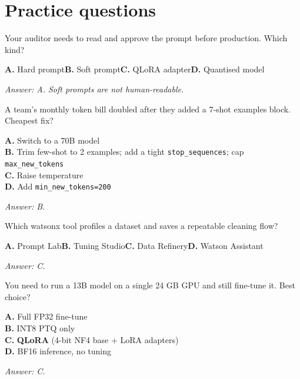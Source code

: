 \section{Practice questions}

\begin{practicebox}[title=\textbf{Q3.1 --- Hard vs Soft}]
Your auditor needs to read and approve the prompt before production. Which kind?

\textbf{A.} Hard prompt\hspace{1em}\textbf{B.} Soft prompt\hspace{1em}\textbf{C.} QLoRA adapter\hspace{1em}\textbf{D.} Quantised model

\vspace{0.2cm}\textit{Answer: A. Soft prompts are not human-readable.}
\end{practicebox}

\begin{practicebox}[title=\textbf{Q3.2 --- Cost cut}]
A team's monthly token bill doubled after they added a 7-shot examples block. Cheapest fix?

\textbf{A.} Switch to a 70B model\\
\textbf{B.} Trim few-shot to 2 examples; add a tight \texttt{stop\_sequences}; cap \texttt{max\_new\_tokens}\\
\textbf{C.} Raise temperature\\
\textbf{D.} Add \texttt{min\_new\_tokens=200}

\vspace{0.2cm}\textit{Answer: B.}
\end{practicebox}

\begin{practicebox}[title=\textbf{Q3.3 --- Data prep}]
Which watsonx tool profiles a dataset and saves a repeatable cleaning flow?

\textbf{A.} Prompt Lab\hspace{1em}\textbf{B.} Tuning Studio\hspace{1em}\textbf{C.} Data Refinery\hspace{1em}\textbf{D.} Watson Assistant

\vspace{0.2cm}\textit{Answer: C.}
\end{practicebox}

\begin{practicebox}[title=\textbf{Q3.4 --- Quantisation}]
You need to run a 13B model on a single 24 GB GPU and still fine-tune it. Best choice?

\textbf{A.} Full FP32 fine-tune\\
\textbf{B.} INT8 PTQ only\\
\textbf{C.} \textbf{QLoRA} (4-bit NF4 base + LoRA adapters)\\
\textbf{D.} BF16 inference, no tuning

\vspace{0.2cm}\textit{Answer: C.}
\end{practicebox}

